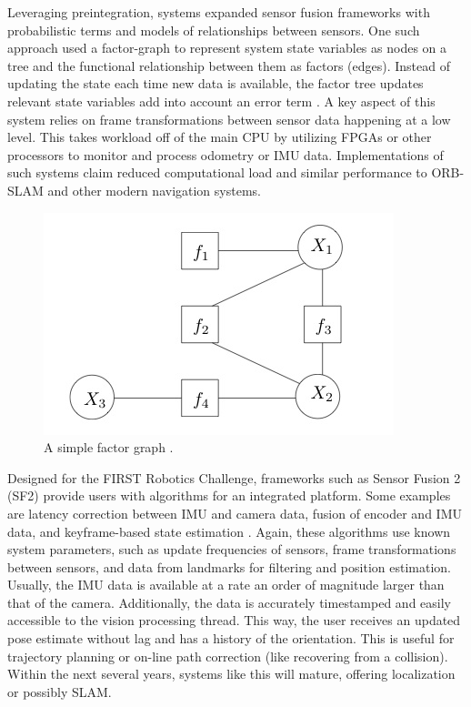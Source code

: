 \documentclass{article}
\begin{document}
        Leveraging preintegration, systems expanded sensor fusion frameworks with probabilistic terms and models of relationships between sensors. One such approach used a factor-graph to represent system state variables as nodes on a tree and the functional relationship between them as factors (edges). Instead of updating the state each time new data is available, the factor tree updates relevant state variables add into account an error term \cite{vadim_indelman_information_2013}. A key aspect of this system relies on frame transformations between sensor data happening at a low level. This takes workload off of the main CPU by utilizing FPGAs or other processors to monitor and process odometry or IMU data. Implementations of such systems claim reduced computational load and similar performance to ORB-SLAM and other modern navigation systems.

    \begin{figure}[H]
      \centering
      \includegraphics[width=0.4\linewidth]{./images/Factorgraph.jpg}
      \caption{A simple factor graph \cite{hwymeers_example_2008}.}
      \label{fig:ex_factor_graph}
    \end{figure}

      Designed for the FIRST Robotics Challenge, frameworks such as Sensor Fusion 2 (SF2) provide users with algorithms for an integrated platform. Some examples are latency correction between IMU and camera data, fusion of encoder and IMU data, and keyframe-based state estimation \cite{kauai_labs_inc_video_2017}. Again, these algorithms use known system parameters, such as update frequencies of sensors, frame transformations between sensors, and data from landmarks for filtering and position estimation. Usually, the IMU data is available at a rate an order of magnitude larger than that of the camera. Additionally, the data is accurately timestamped and easily accessible to the vision processing thread. This way, the user receives an updated pose estimate without lag and has a history of the orientation. This is useful for trajectory planning or on-line path correction (like recovering from a collision). Within the next several years, systems like this will mature, offering localization or possibly SLAM.
\end{document}
